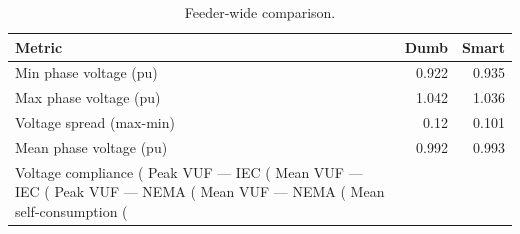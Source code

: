 \begin{table}[h]
\centering
\caption{Feeder-wide comparison.}
\label{tab:feeder-summary}
\begin{tabular}{lrr}
\toprule
Metric & Dumb & Smart \\
\midrule
Min phase voltage (pu) & 0.922 & 0.935 \\
Max phase voltage (pu) & 1.042 & 1.036 \\
Voltage spread (max-min) & 0.12 & 0.101 \\
Mean phase voltage (pu) & 0.992 & 0.993 \\
Voltage compliance (%
Peak VUF — IEC (%
Mean VUF — IEC (%
Peak VUF — NEMA (%
Mean VUF — NEMA (%
Mean self-consumption (%
\bottomrule
\end{tabular}
\end{table}
